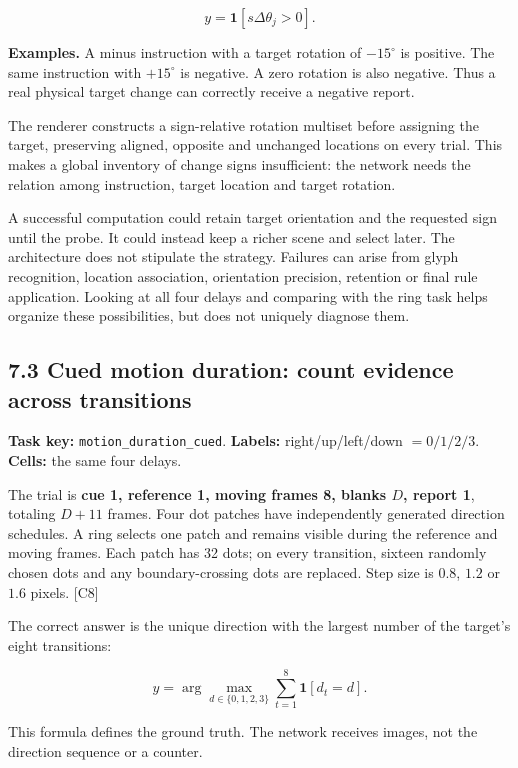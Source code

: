 \documentclass[
  11pt,
]{article}
\let\oldsubsection\subsection
\renewcommand{\subsection}{\Needspace{6\baselineskip}\oldsubsection}
\begin{document}
\[y=\mathbf1[s\Delta\theta_j>0].\]

\textbf{Examples.} A minus instruction with a target rotation of
\(-15^\circ\) is positive. The same instruction with \(+15^\circ\) is
negative. A zero rotation is also negative. Thus a real physical target
change can correctly receive a negative report.

The renderer constructs a sign-relative rotation multiset before
assigning the target, preserving aligned, opposite and unchanged
locations on every trial. This makes a global inventory of change signs
insufficient: the network needs the relation among instruction, target
location and target rotation.

A successful computation could retain target orientation and the
requested sign until the probe. It could instead keep a richer scene and
select later. The architecture does not stipulate the strategy. Failures
can arise from glyph recognition, location association, orientation
precision, retention or final rule application. Looking at all four
delays and comparing with the ring task helps organize these
possibilities, but does not uniquely diagnose them.

\subsection{7.3 Cued motion duration: count evidence across
transitions}\label{cued-motion-duration-count-evidence-across-transitions}

\textbf{Task key:} \texttt{motion\_duration\_cued}. \textbf{Labels:}
right/up/left/down \(=0/1/2/3\). \textbf{Cells:} the same four delays.

The trial is \textbf{cue 1, reference 1, moving frames 8, blanks \(D\),
report 1}, totaling \(D+11\) frames. Four dot patches have independently
generated direction schedules. A ring selects one patch and remains
visible during the reference and moving frames. Each patch has 32 dots;
on every transition, sixteen randomly chosen dots and any
boundary-crossing dots are replaced. Step size is \(0.8\), \(1.2\) or
\(1.6\) pixels. {[}C8{]}

The correct answer is the unique direction with the largest number of
the target's eight transitions:

\[y=\arg\max_{d\in\{0,1,2,3\}}\sum_{t=1}^{8}\mathbf1[d_t=d].\]

This formula defines the ground truth. The network receives images, not
the direction sequence or a counter.
\end{document}
